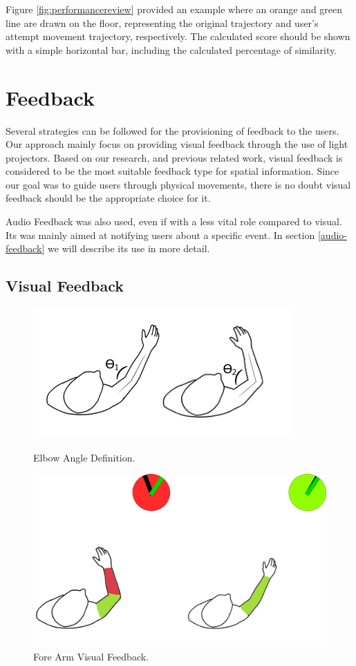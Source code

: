 Figure \ref{fig:performancereview} provided an example where an orange and green line are drawn on the floor, representing the original trajectory and user's attempt movement trajectory, respectively. 
The calculated score should be shown with a simple horizontal bar, including the calculated percentage of similarity.


\section{Feedback}
\label{sec:feedback}

Several strategies can be followed for the provisioning of feedback to the users. 
Our approach mainly focus on providing visual feedback through the use of light projectors. 
Based on our research, and previous related work, visual feedback is considered to be the most suitable feedback type for spatial information. 
Since our goal was to guide users through physical movements, there is no doubt visual feedback should be the appropriate choice for it.

Audio Feedback was also used, even if with a less vital role compared to visual.
Its was mainly aimed at notifying users about a specific event. In section \ref{audio-feedback} we will describe its use in more detail.


\subsection{Visual Feedback}
\label{vision-feedback}


\begin{figure}[!t]
  \centering
  \includegraphics[width=0.7\linewidth]{imgs/approach/elbowangle}
    \caption{Elbow Angle Definition.}
    \label{fig:elbowangle}
    \endminipage\hfill
{}
  \centering
  \includegraphics[width=0.9\linewidth]{imgs/approach/forearmfeedback}
    \caption{Fore Arm Visual Feedback.}
    \label{fig:forearmfeedback}
    \endminipage
\end{figure}



